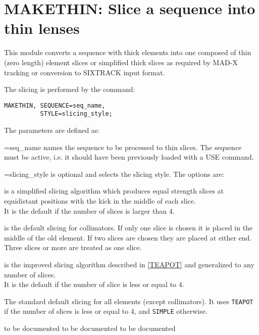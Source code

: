  
\chapter{MAKETHIN: Slice a sequence into thin lenses}
\label{chap:makethin}

This module converts a sequence with thick elements into one composed of
thin (zero length) element slices or simplified thick slices as required
by MAD-X tracking or conversion to SIXTRACK input format.

The slicing is performed by the command: 
\begin{verbatim}
MAKETHIN, SEQUENCE=seq_name,
          STYLE=slicing_style;
\end{verbatim} 

The parameters are defined as: 
\begin{madlist}
   =seq\_name names the sequence to be processed to thin
     slices. The sequence must be active, i.e. it should have been
     previously loaded with a USE command. 

   =slicing\_style is optional and selects the slicing
     style. The options are:    

     \begin{madlist}
      is a simplified slicing algorithm which produces
     equal strength slices at equidistant positions with the kick in the
     middle of each slice. \\ 
     It is the default if the number of slices is larger than 4. 

      is the default slicing for collimators. If only
     one slice is  chosen it is placed in the middle of the old
     element. If two slices are chosen they  are placed at either
     end. Three slices or more are treated as one slice.      

      is the improved slicing algorithm described in
     \href{../Introduction/bibliography.html#TEAPOT}{[TEAPOT]} and
     generalized to any number of slices. \\
     It is the default if the number of slice is less or equal to 4.

      The standard default slicing for all
     elements (except collimators). It uses {\tt TEAPOT} if the number
     of slices is less or equal to 4, and {\tt SIMPLE} otherwise.
     \end{madlist}
     
      to be documented
      to be documented
      to be documented
\end{madlist}


